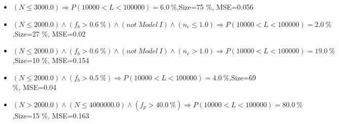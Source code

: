 \documentclass[numbered]{CSL}
\begin{document}
\begin{itemize}
\item $(N \leq 3000.0) \Rightarrow P(10 000 < L < 100 000) = 6.0~\%$,\hfill Size=75 \%, MSE=0.056
\item $(N \leq 2000.0) \land (f_b > 0.6~\%) \land (not~Model~I) \land (n_e \leq 1.0) \Rightarrow P(10 000 < L < 100 000) = 2.0~\%$,\hfill Size=27 \%, MSE=0.02
\item $(N \leq 2000.0) \land (f_b > 0.6~\%) \land (not~Model~I) \land (n_e > 1.0) \Rightarrow P(10 000 < L < 100 000) = 19.0~\%$,\hfill Size=10 \%, MSE=0.154
\item $(N \leq 2000.0) \land (f_b > 0.5~\%) \Rightarrow P(10 000 < L < 100 000) = 4.0~\%$,\hfill Size=69 \%, MSE=0.04
\item $(N > 2000.0) \land (N \leq 4000000.0) \land (f_p > 40.0~\%) \Rightarrow P(10 000 < L < 100 000) = 80.0~\%$,\hfill Size=15 \%, MSE=0.163
\end{itemize}
\end{document}
